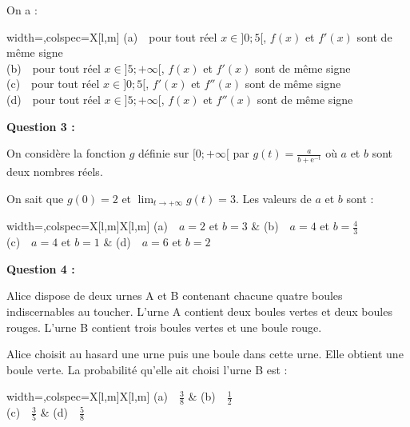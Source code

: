 On a :

\begin{tblr}{width=\linewidth,colspec={X[l,m]}}
	(a)~~pour tout réel $x \in ]0;5[$, $f(x)$ et $f'(x)$ sont de même signe \\
	(b)~~pour tout réel $x \in ]5;+\infty[$, $f(x)$ et $f'(x)$ sont de même signe \\
	(c)~~pour tout réel $x \in ]0;5[$, $f'(x)$ et $f''(x)$ sont de même signe \\
	(d)~~pour tout réel $x \in ]5;+\infty[$, $f(x)$ et $f''(x)$ sont de même signe
\end{tblr}

\bigskip

\textbf{Question 3 :}

\medskip

On considère la fonction $g$ définie sur $[0;+\infty[$ par $g(t)=\frac{a}{b+\text{e}^{-t}}$ où $a$ et $b$ sont deux nombres réels.

On sait que $g(0)=2$ et $\displaystyle\lim_{t \to +\infty} g(t)=3$. Les valeurs de $a$ et $b$ sont :

\medskip

\begin{tblr}{width=\linewidth,colspec={X[l,m]X[l,m]}}
	(a)~~$a=2$ et $b=3$ & (b)~~$a=4$ et $b=\frac43$ \\
	(c)~~$a=4$ et $b=1$ & (d)~~$a=6$ et $b=2$
\end{tblr}

\bigskip

\textbf{Question 4 :}

\medskip

Alice dispose de deux urnes A et B contenant chacune quatre boules indiscernables au toucher. L'urne A contient deux boules vertes et deux boules rouges. L'urne B contient trois boules vertes et une boule rouge.

\smallskip

Alice choisit au hasard une urne puis une boule dans cette urne. Elle obtient une boule verte. La probabilité qu'elle ait choisi l'urne B est :

\medskip

\begin{tblr}{width=\linewidth,colspec={X[l,m]X[l,m]}}
	(a)~~$\frac38$ & (b)~~$\frac12$ \\
	(c)~~$\frac35$ & (d)~~$\frac58$ \\
\end{tblr}

\bigskip

